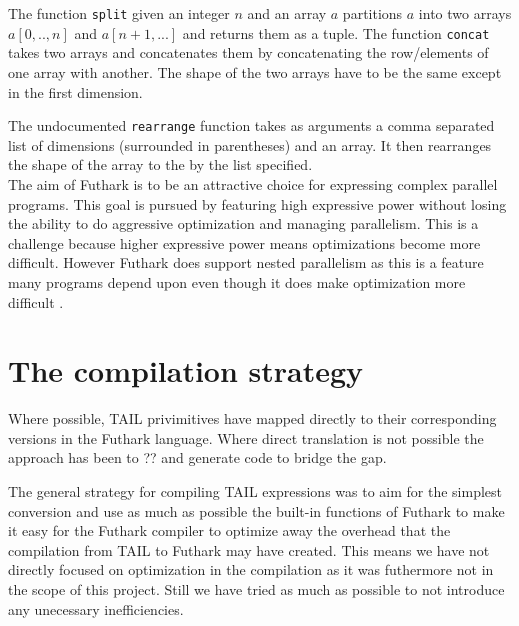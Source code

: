 \documentclass[11pt]{article}
\begin{document}
The function {\tt split} given an integer $n$ and an array $a$ partitions $a$ into two arrays $a[0,..,n]$ and $a[n+1,...]$ and returns them as a tuple. 
The function {\tt concat} takes two arrays and concatenates them by concatenating the row/elements of one array with another. The shape of the two arrays have to be the same except in the first dimension. 

The undocumented {\tt rearrange} function takes as arguments a comma separated list of dimensions (surrounded in parentheses) and an array. It then rearranges the shape of the array to the by the list specified. \\

The aim of Futhark is to be an attractive choice for expressing complex parallel programs.
This goal is pursued by featuring high expressive power without
losing the ability to do aggressive optimization and managing parallelism.
This is a challenge because higher expressive power means optimizations become more difficult. 
However Futhark does support nested parallelism as this is a feature many programs 
depend upon even though it does make optimization more difficult \cite{TroelsHenriksen}.




\section{The compilation strategy}
Where possible, TAIL privimitives have mapped directly to their corresponding versions in the Futhark language.
Where direct translation is not possible the approach has been to ?? and generate code to bridge the gap.



The general strategy for compiling TAIL expressions was to aim for the simplest conversion and use as much as possible 
the built-in functions of Futhark to make it easy for the Futhark compiler to optimize away the overhead that the compilation
from TAIL to Futhark may have created.
This means we have not directly focused on optimization in the compilation as it was futhermore not in the scope of this project.
Still we have tried as much as possible to not introduce any unecessary inefficiencies.\\
\end{document}

